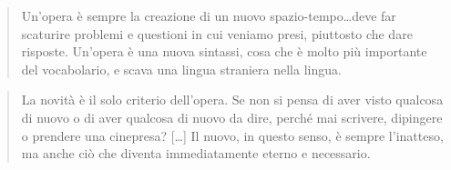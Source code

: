 \begin{quote}
\begin{sf}
\small
  Un'opera è sempre la creazione di un nuovo spazio-tempo\ldots deve far scaturire
  problemi e questioni in cui veniamo presi, piuttosto che dare risposte. Un'opera
  è una nuova sintassi, cosa che è molto più importante del vocabolario, e scava
  una lingua straniera nella lingua.
  \cite{deleuze2009}
  \end{sf}
\end{quote}

\begin{quote}
\begin{sf}
\small
  La novità è il solo criterio dell'opera. Se non si pensa di aver visto
  qualcosa di nuovo o di aver qualcosa di nuovo da dire, perché mai scrivere,
  dipingere o prendere una cinepresa? [\ldots] Il nuovo, in questo senso, è
  sempre l'inatteso, ma anche ciò che diventa immediatamente eterno e necessario.

  \cite{deleuze2009}
  \end{sf}
\end{quote}
